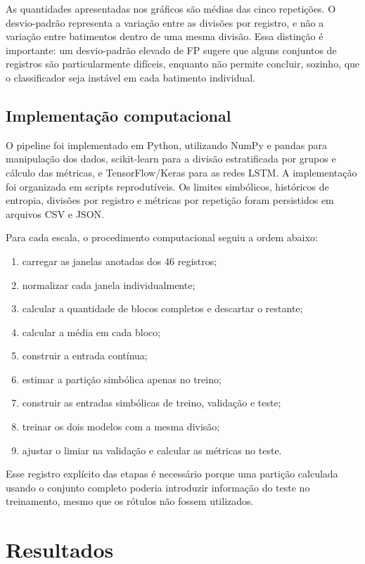 \documentclass[12pt,a4paper]{article}
\begin{document}
As quantidades apresentadas nos gráficos são médias das cinco repetições. O desvio-padrão representa a variação entre as divisões por registro, e não a variação entre batimentos dentro de uma mesma divisão. Essa distinção é importante: um desvio-padrão elevado de FP sugere que alguns conjuntos de registros são particularmente difíceis, enquanto não permite concluir, sozinho, que o classificador seja instável em cada batimento individual.

\subsection{Implementação computacional}

O pipeline foi implementado em Python, utilizando NumPy e pandas para manipulação dos dados, scikit-learn para a divisão estratificada por grupos e cálculo das métricas, e TensorFlow/Keras para as redes LSTM. A implementação foi organizada em scripts reprodutíveis. Os limites simbólicos, históricos de entropia, divisões por registro e métricas por repetição foram persistidos em arquivos CSV e JSON.

Para cada escala, o procedimento computacional seguiu a ordem abaixo:

\begin{enumerate}
    \item carregar as janelas anotadas dos 46 registros;
    \item normalizar cada janela individualmente;
    \item calcular a quantidade de blocos completos e descartar o restante;
    \item calcular a média em cada bloco;
    \item construir a entrada contínua;
    \item estimar a partição simbólica apenas no treino;
    \item construir as entradas simbólicas de treino, validação e teste;
    \item treinar os dois modelos com a mesma divisão;
    \item ajustar o limiar na validação e calcular as métricas no teste.
\end{enumerate}

Esse registro explícito das etapas é necessário porque uma partição calculada usando o conjunto completo poderia introduzir informação do teste no treinamento, mesmo que os rótulos não fossem utilizados.

\section{Resultados}
\end{document}
